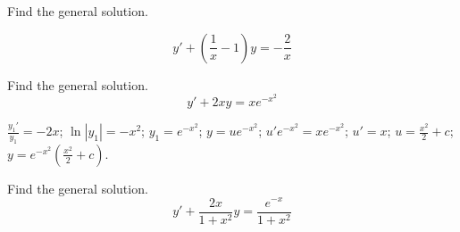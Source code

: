 \documentclass{ximera}
\begin{document}
\begin{problem}\label{exer:2.1.13} Find
the general solution. 

$$y'+\left(\frac{1}{x}-1\right)y=-\frac{2}{x}$$



\end{problem}

\begin{problem}\label{exer:2.1.14} Find
the general solution. 
$$y'+2xy=xe^{-x^2}$$





\begin{solution}
    $\frac{y_1'}{ y_1}=-2x$;\quad
$\ln|y_1|=-x^2$;\quad
$y_1=e^{-x^2}$;\quad
$y=ue^{-x^2}$;\quad
$u'e^{-x^2}=xe^{-x^2}$;\quad
$u'=x$;\quad
$u=\frac{x^2}{2}+c$;\quad
$y=e^{-x^2}\left(\frac{x^2}{2}+c\right)$.

\end{solution}
\end{problem}

\begin{problem}\label{exer:2.1.15} Find
the general solution. 
$$y'+\frac{2x}{1+x^2}y=\frac{e^{-x}}{1+x^2}$$



\end{problem}
\end{document}
